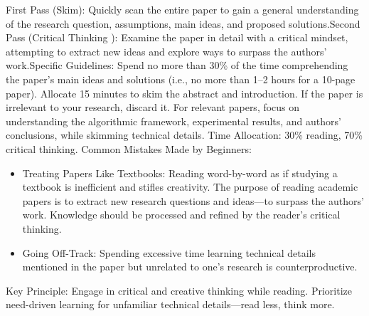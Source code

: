 \documentclass[conference]{IEEEtran}
\begin{document}
First Pass (Skim): Quickly scan the entire paper to gain a general understanding of the research question, assumptions, main ideas, and proposed solutions.Second Pass (Critical Thinking ): Examine the paper in detail with a critical mindset, attempting to extract new ideas and explore ways to surpass the authors' work.Specific Guidelines: Spend no more than 30\% of the time comprehending the paper’s main ideas and solutions (i.e., no more than 1–2 hours for a 10-page paper). Allocate 15 minutes to skim the abstract and introduction. If the paper is irrelevant to your research, discard it. For relevant papers, focus on understanding the algorithmic framework, experimental results, and authors' conclusions, while skimming technical details. Time Allocation: 30\% reading, 70\% critical thinking.
Common Mistakes Made by Beginners:
\begin{itemize}
\item Treating Papers Like Textbooks: Reading word-by-word as if studying a textbook is inefficient and stifles creativity. The purpose of reading academic papers is to extract new research questions and ideas—to surpass the authors’ work. Knowledge should be processed and refined by the reader’s critical thinking.
\item Going Off-Track: Spending excessive time learning technical details mentioned in the paper but unrelated to one’s research is counterproductive.
\end{itemize}
Key Principle: Engage in critical and creative thinking while reading. Prioritize need-driven learning for unfamiliar technical details—read less, think more.
\end{document}
